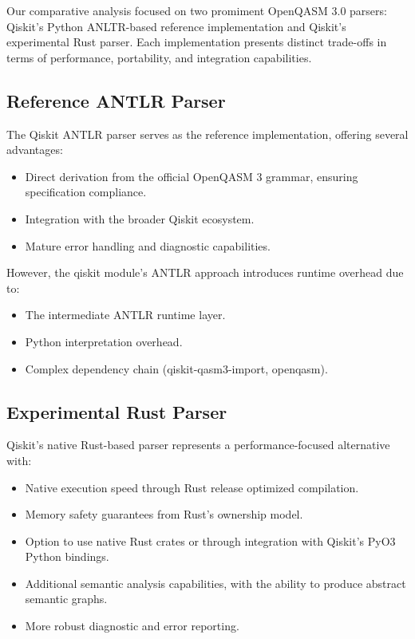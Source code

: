 \documentclass{article}
\begin{document}
Our comparative analysis focused on two promiment OpenQASM 3.0 parsers: Qiskit's Python ANLTR-based reference implementation and Qiskit's experimental Rust parser. Each implementation presents distinct trade-offs in terms of performance, portability, and integration capabilities.

\subsection{Reference ANTLR Parser}

The Qiskit ANTLR parser serves as the reference implementation, offering several advantages:

\begin{itemize}
    \item Direct derivation from the official OpenQASM 3 grammar, ensuring specification compliance.
    \item Integration with the broader Qiskit ecosystem.
    \item Mature error handling and diagnostic capabilities.
\end{itemize}

\noindent However, the qiskit module's ANTLR approach introduces runtime overhead due to:

\begin{itemize}
    \item The intermediate ANTLR runtime layer.
    \item Python interpretation overhead.
    \item Complex dependency chain (qiskit-qasm3-import, openqasm).
\end{itemize}

\subsection{Experimental Rust Parser}

Qiskit's native Rust-based parser represents a performance-focused alternative with:

\begin{itemize}
    \item Native execution speed through Rust release optimized compilation.
    \item Memory safety guarantees from Rust's ownership model.
    \item Option to use native Rust crates or through integration with Qiskit's PyO3 Python bindings.
    \item Additional semantic analysis capabilities, with the ability to produce abstract semantic graphs.
    \item More robust diagnostic and error reporting.
\end{itemize}
\end{document}
